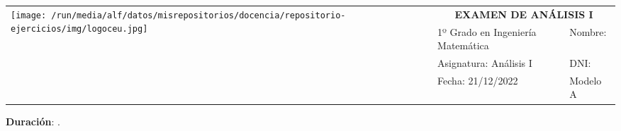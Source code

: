 \documentclass[a4paper]{article}
\makeatletter
\newcommand{\myTime}{\@Time}
\makeatother
\begin{document}
\begin{center}
\doublespacing
\sffamily
\begin{tabular}{|p{}|p{}|p{}|}
\hline
\multirow{4}{*}{\texttt{[image: /run/media/alf/datos/misrepositorios/docencia/repositorio-ejercicios/img/logoceu.jpg]}} & \multicolumn{2}{c|}{\LARGE \textbf{EXAMEN DE ANÁLISIS I}} \\
\cline{2-3}
& 1º Grado en Ingeniería Matemática & Nombre: \\
\cline{2-3}
& Asignatura: Análisis I & DNI: \\
\cline{2-3}
& Fecha: 21/12/2022 & Modelo A\\
\hline
\end{tabular}
\end{center}

\noindent\textbf{Duración}: \myTime. \vskip 1cm

\begin{enumerate}[leftmargin=*]

\end{enumerate}
\end{document}
